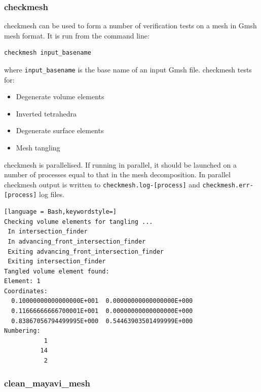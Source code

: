 
\subsubsection{checkmesh}
\label{sec:checkmesh}
checkmesh can be used to form a number of verification tests on a mesh in Gmsh mesh
format. It is run from the command line:
\begin{lstlisting}[language = Bash]
checkmesh input_basename
\end{lstlisting}
where \lstinline[language = Bash]+input_basename+ is the base name of an input Gmsh file. checkmesh tests for:
\begin{itemize}
\item Degenerate volume elements
\item Inverted tetrahedra
\item Degenerate surface elements
\item Mesh tangling
\end{itemize}

checkmesh is parallelised. If running in parallel, it should be launched on a number of processes equal to that in the mesh decomposition. In parallel checkmesh output is written to
\lstinline[language = Bash]+checkmesh.log-[process]+ and \lstinline[language = Bash]+checkmesh.err-[process]+ log files.

\begin{example}
\begin{lstlisting}[language = Bash,keywordstyle=]
Checking volume elements for tangling ...
 In intersection_finder
 In advancing_front_intersection_finder
 Exiting advancing_front_intersection_finder
 Exiting intersection_finder
Tangled volume element found:
Element: 1
Coordinates:
  0.10000000000000000E+001  0.00000000000000000E+000
  0.11666666666700001E+001  0.00000000000000000E+000
  0.83867056794499995E+000  0.54463903501499999E+000
Numbering:
           1
          14
           2
\end{lstlisting}
\caption{checkmesh reporting a mesh tangling error.}
\end{example}


\subsubsection{clean\_mayavi\_mesh}
\label{sec:clean_mayavi_mesh}

